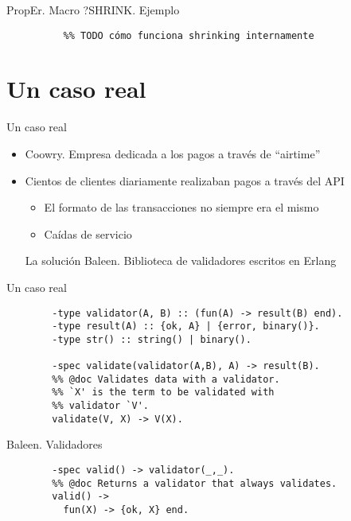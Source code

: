 \documentclass{beamer}
\begin{document}
      \begin{frame}[fragile]{PropEr. Macro ?SHRINK. Ejemplo}
        \begin{verbatim}
          %% TODO cómo funciona shrinking internamente
        \end{verbatim}
      \end{frame}

  \section{Un caso real}
    \begin{frame}{Un caso real}
      \begin{itemize}
        \item Coowry. Empresa dedicada a los pagos a través de ``airtime''
        \item Cientos de clientes diariamente realizaban pagos a través del API
        \begin{itemize}
          \item El formato de las transacciones no siempre era el mismo
          \item Caídas de servicio
        \end{itemize}
        \pause
        \begin{exampleblock}{La solución}
          Baleen. Biblioteca de validadores escritos en Erlang
        \end{exampleblock}
      \end{itemize}
    \end{frame}

    \begin{frame}[fragile]{Un caso real}
      \begin{verbatim}
        -type validator(A, B) :: (fun(A) -> result(B) end).
        -type result(A) :: {ok, A} | {error, binary()}.
        -type str() :: string() | binary().

        -spec validate(validator(A,B), A) -> result(B).
        %% @doc Validates data with a validator.
        %% `X' is the term to be validated with
        %% validator `V'.
        validate(V, X) -> V(X).
      \end{verbatim}
    \end{frame}

    \begin{frame}[fragile]{Baleen. Validadores}
      \begin{verbatim}
        -spec valid() -> validator(_,_).
        %% @doc Returns a validator that always validates.
        valid() ->
          fun(X) -> {ok, X} end.
      \end{verbatim}
    \end{frame}
\end{document}
